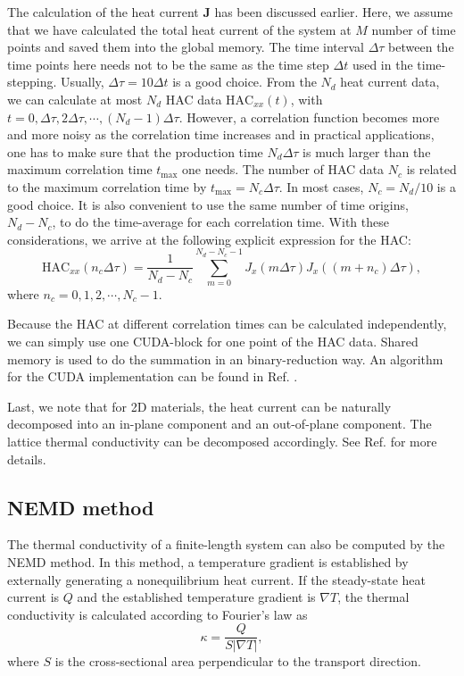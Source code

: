 \documentclass[12pt,a4paper]{report}
\newcommand{\vect}[1]{\boldsymbol{#1}}
\begin{document}
The calculation of the heat current $\vect{J}$ has been discussed earlier. Here, we assume that we have calculated the total heat current of the system at $M$ number of time points and saved them into the global memory. The time interval
$\Delta \tau$ between the time points here needs not to be the same as the time step $\Delta t$ used in the time-stepping. Usually, $\Delta \tau = 10 \Delta t$ is a good choice. From the $N_d$ heat current data, we can calculate at most $N_d$ HAC data $\text{HAC}_{xx}(t)$, with $t=0, \Delta \tau, 2\Delta \tau, \cdots, (N_d-1)\Delta \tau$. However, a correlation function becomes more and more noisy as the correlation time increases and in practical applications, one has to make sure that the production time $N_d\Delta \tau$ is much larger than the maximum correlation time $t_{\text{max}}$ one needs. The number of HAC data $N_c$ is related to the maximum correlation time by $t_{\text{max}} = N_c \Delta \tau$. In most cases, $N_c=N_d/10$ is a good choice. It is also convenient to use the same number of time origins, $N_d-N_c$, to do the time-average for each correlation time.  With these considerations, we arrive at the following explicit expression for the HAC:
\begin{equation}
\label{equation:HAC}
\text{HAC}_{xx}(n_c\Delta \tau) = \frac{1}{N_d-N_c}
\sum_{m=0}^{N_d-N_c-1}
J_x(m\Delta \tau) J_x((m+n_c)\Delta \tau),
\end{equation}
where $n_c = 0, 1, 2, \cdots, N_c-1$.


Because the HAC at different correlation times can be calculated independently, we can simply use one CUDA-block for one point of the  HAC data. Shared memory is used to do the summation in an binary-reduction way. An algorithm for the CUDA implementation can be found in Ref. \cite{fan2013cpc}.

Last, we note that for 2D materials, the heat current can be naturally decomposed into an in-plane component and an out-of-plane component. The lattice thermal conductivity can be decomposed accordingly. See Ref. \cite{fan2017prb} for more details.



\subsection{NEMD method}

The thermal conductivity of a finite-length system can also be computed by the NEMD method. In this method, a temperature gradient is established by externally generating a nonequilibrium heat current. If the steady-state heat current is $Q$ and the established temperature gradient is $\nabla T$, the thermal conductivity is calculated according to Fourier's law as
\begin{equation}
\boxed{\kappa = \frac{Q} { S |\nabla T|}},
\end{equation}
where $S$ is the cross-sectional area perpendicular to the transport direction.
\end{document}
